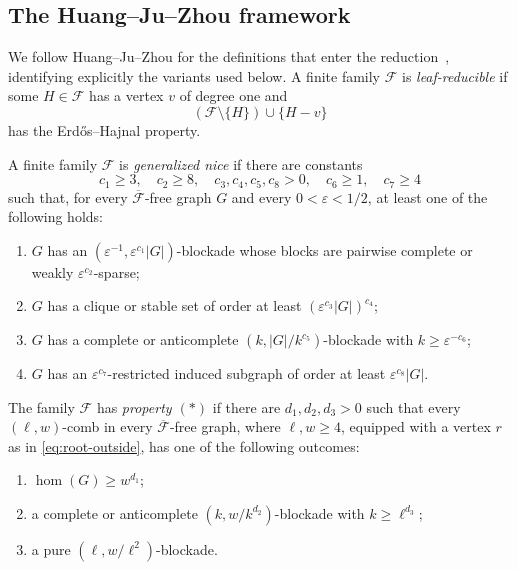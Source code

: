 \documentclass[11pt]{article}
\numberwithin{equation}{section}
\theoremstyle{plain}
\theoremstyle{definition}
\begin{document}
\subsection{The Huang--Ju--Zhou framework}

We follow Huang--Ju--Zhou for the definitions that enter the
reduction~\cite{HuangJuZhou2026}, identifying explicitly the variants
used below.  A finite family $\mathcal F$ is
\emph{leaf-reducible} if some $H\in\mathcal F$ has a vertex $v$ of
degree one and
\[
                  (\mathcal F\setminus\{H\})\cup\{H-v\}
\]
has the Erd\H{o}s--Hajnal property.

A finite family $\mathcal F$ is \emph{generalized nice} if there are
constants
\[
 c_1\geq3,\quad c_2\geq8,\quad c_3,c_4,c_5,c_8>0,
 \quad c_6\geq1,\quad c_7\geq4
\]
such that, for every $\overline{\mathcal F}$-free graph $G$ and every
$0<\varepsilon<1/2$, at least one of the following holds:
\begin{enumerate}[label=(GN\arabic*)]
 \item $G$ has an
       $(\varepsilon^{-1},\varepsilon^{c_1}|G|)$-blockade whose blocks
       are pairwise complete or weakly $\varepsilon^{c_2}$-sparse;
 \item $G$ has a clique or stable set of order at least
       $(\varepsilon^{c_3}|G|)^{c_4}$;
 \item $G$ has a complete or anticomplete
       $(k,|G|/k^{c_5})$-blockade with
       $k\geq\varepsilon^{-c_6}$;
 \item $G$ has an $\varepsilon^{c_7}$-restricted induced subgraph of
       order at least $\varepsilon^{c_8}|G|$.
\end{enumerate}

The family $\mathcal F$ has \emph{property $(*)$} if there are
$d_1,d_2,d_3>0$ such that every $(\ell,w)$-comb in every
$\overline{\mathcal F}$-free graph, where $\ell,w\geq4$, equipped with
a vertex $r$ as in \eqref{eq:root-outside}, has one of the following
outcomes:
\begin{enumerate}[label=(\ensuremath{*}\arabic*)]
 \item $\operatorname{hom}(G)\geq w^{d_1}$;
 \item a complete or anticomplete $(k,w/k^{d_2})$-blockade with
       $k\geq\ell^{d_3}$;
 \item a pure $(\ell,w/\ell^2)$-blockade.
\end{enumerate}
\end{document}
